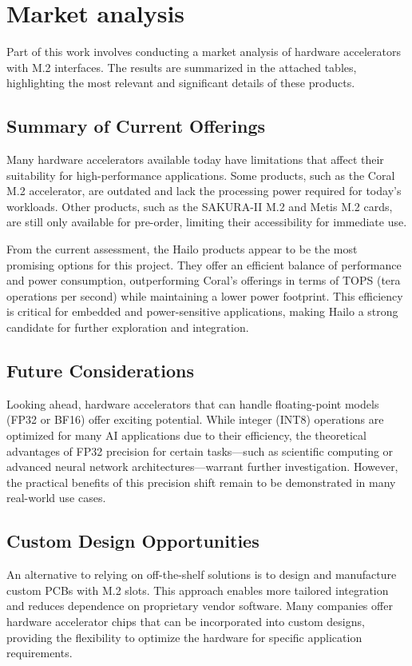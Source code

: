\chapter{Market analysis}

Part of this work involves conducting a market analysis of hardware accelerators with M.2 interfaces. 
The results are summarized in the attached tables, highlighting the most relevant and significant details of these products.

\section{Summary of Current Offerings}
Many hardware accelerators available today have limitations that affect their suitability for high-performance applications.
Some products, such as the Coral M.2 accelerator, are outdated and lack the processing power required for today's workloads.
Other products, such as the SAKURA-II M.2 and Metis M.2 cards, are still only available for pre-order, limiting their accessibility for immediate use.

From the current assessment, the Hailo products appear to be the most promising options for this project.
They offer an efficient balance of performance and power consumption, outperforming Coral's offerings in terms of TOPS (tera operations per second) while maintaining a lower power footprint.
This efficiency is critical for embedded and power-sensitive applications, making Hailo a strong candidate for further exploration and integration.

\section{Future Considerations}
Looking ahead, hardware accelerators that can handle floating-point models (FP32 or BF16) offer exciting potential.
While integer (INT8) operations are optimized for many AI applications due to their efficiency, the theoretical advantages of FP32 precision for certain tasks—such as scientific computing or advanced neural network architectures—warrant further investigation.
However, the practical benefits of this precision shift remain to be demonstrated in many real-world use cases.


\section{Custom Design Opportunities}
An alternative to relying on off-the-shelf solutions is to design and manufacture custom PCBs with M.2 slots.
This approach enables more tailored integration and reduces dependence on proprietary vendor software. 
Many companies offer hardware accelerator chips that can be incorporated into custom designs, providing the flexibility to optimize the hardware for specific application requirements.


